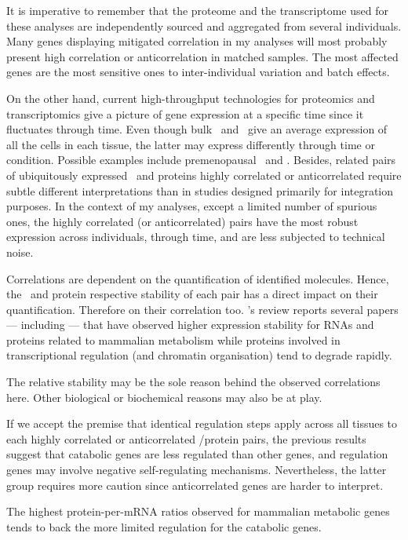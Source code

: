 It is imperative to remember that the proteome and the transcriptome used
for these analyses are independently sourced and aggregated from several individuals.
Many genes displaying mitigated correlation in my analyses will most probably
present high correlation or anticorrelation in matched samples.
The most affected genes are the most sensitive ones
to inter-individual variation and batch effects.

On the other hand,
current high-throughput technologies
for proteomics and transcriptomics give a picture of gene expression
at a specific time
since it fluctuates through time.
Even though bulk \Rnaseq\ and \ms\ give an average expression
of all the cells in each tissue,
the latter may express differently through time or condition.
Possible examples include premenopausal \Ovary\ and \Uterus.
Besides, related pairs of ubiquitously expressed \mRNAs\ and proteins
highly correlated or anticorrelated require subtle different interpretations
than in studies designed primarily for integration purposes.
In the context of my analyses,
except a limited number of spurious ones,
the highly correlated (or anticorrelated) pairs have
the most robust expression across individuals, through time,
and are less subjected to technical noise.

Correlations are dependent on the quantification of identified molecules.
Hence, the \mRNA\ and protein respective stability of each pair has
a direct impact on their quantification.
Therefore on their correlation too.
\citet{Vogel2012-sq}'s review reports several papers
--- including \citet{schwanhausserglobal:2011} ---
that have observed higher expression stability for
\glspl{RNA} and proteins related to mammalian metabolism
while proteins involved in transcriptional regulation (and chromatin organisation)
tend to degrade rapidly.\mybr\

The relative stability may be the sole reason behind the observed correlations here.
Other biological or biochemical reasons may also be at play.

If we accept the premise that
identical regulation steps apply across all tissues
to each highly correlated or anticorrelated \mRNA/protein pairs,
the previous results suggest that
catabolic genes are less regulated than other genes,
and
regulation genes may involve negative self-regulating mechanisms.
Nevertheless, the latter group requires more caution
since anticorrelated genes are harder to interpret.\mybr\

The highest protein-per-mRNA ratios observed
for mammalian metabolic genes~ tends
to back the more limited regulation for the catabolic genes.

